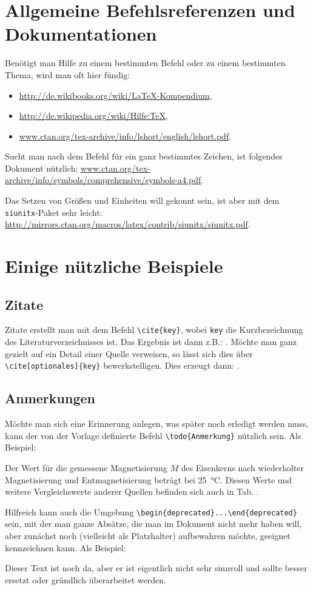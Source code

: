 \section{Allgemeine Befehlsreferenzen und Dokumentationen}
Benötigt man Hilfe zu einem bestimmten Befehl oder zu einem bestimmten Thema, wird man oft hier fündig:

\begin{itemize}
 \item \url{http://de.wikibooks.org/wiki/LaTeX-Kompendium},
 \item \url{http://de.wikipedia.org/wiki/Hilfe:TeX},
 \item \url{www.ctan.org/tex-archive/info/lshort/english/lshort.pdf}.
\end{itemize}

Sucht man nach dem Befehl für ein ganz bestimmtes Zeichen, ist folgendes Dokument nützlich: \url{www.ctan.org/tex-archive/info/symbols/comprehensive/symbols-a4.pdf}.

Das Setzen von Größen und Einheiten will gekonnt sein, ist aber mit dem \verb|siunitx|-Paket sehr leicht: \url{http://mirrors.ctan.org/macros/latex/contrib/siunitx/siunitx.pdf}.

\section{Einige nützliche Beispiele}
\subsection{Zitate}
Zitate erstellt man mit dem Befehl \verb|\cite{key}|, wobei \verb|key| die Kurzbezeichnung des Literaturverzeichnisses ist. Das Ergebnis ist dann z.B.: \cite{Dem10}. Möchte man ganz gezielt auf ein Detail einer Quelle verweisen, so lässt sich dies über \verb|\cite[optionales]{key}| bewerkstelligen. Dies erzeugt dann: \cite[S. 42]{Dem10}.

\subsection{Anmerkungen}
Möchte man sich eine Erinnerung anlegen, was später noch erledigt werden muss, kann der von der Vorlage definierte Befehl \verb|\todo{Anmerkung}| nützlich sein. Als Beispiel:

Der Wert für die gemessene Magnetisierung $M$ des Eisenkerns nach wiederholter Magnetisierung und Entmagnetisierung beträgt  bei \SI{25}{\celsius}. Diesen Werte und weitere Vergleichswerte anderer Quellen befinden sich auch in Tab. .

Hilfreich kann auch die Umgebung \verb|\begin{deprecated}...\end{deprecated}| sein, mit der man ganze Absätze, die man im Dokument nicht mehr haben will, aber zunächst noch (vielleicht als Platzhalter) aufbewahren möchte, geeignet kennzeichnen kann. Als Beispiel:

\begin{deprecated}
Dieser Text ist noch da, aber er ist eigentlich nicht sehr sinnvoll und sollte besser ersetzt oder gründlich überarbeitet werden.
\end{deprecated}
